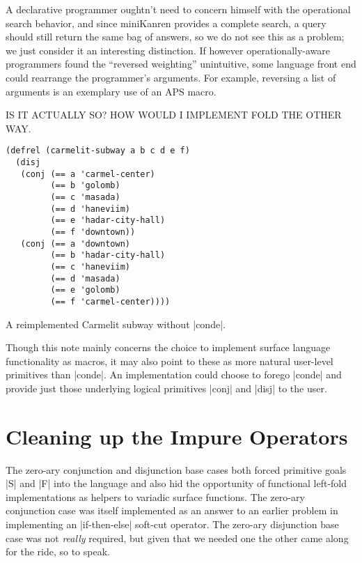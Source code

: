 \documentclass[sigplan,screen,draft,anonymous,review,natbib=false]{acmart}
\begin{document}
A declarative programmer oughtn't need to concern himself with the
operational search behavior, and since miniKanren provides a complete
search, a query should still return the same bag of answers, so we do
not see this as a problem; we just consider it an interesting
distinction. If however operationally-aware programmers found the
\enquote{reversed weighting} unintuitive, some language front end
could rearrange the programmer's arguments. For example, reversing a
list of arguments is an exemplary use of an APS macro.

IS IT ACTUALLY SO? HOW WOULD I IMPLEMENT FOLD THE OTHER WAY.

\begin{listing}
  \begin{verbatim}
(defrel (carmelit-subway a b c d e f)
  (disj
   (conj (== a 'carmel-center)
         (== b 'golomb)
         (== c 'masada)
         (== d 'haneviim)
         (== e 'hadar-city-hall)
         (== f 'downtown))
   (conj (== a 'downtown)
         (== b 'hadar-city-hall)
         (== c 'haneviim)
         (== d 'masada)
         (== e 'golomb)
         (== f 'carmel-center))))
  \end{verbatim}
  \caption{A reimplemented Carmelit subway without \rackinline|conde|.}
  \label{mnt:new-carmelit}
\end{listing}

Though this note mainly concerns the choice to implement surface
language functionality as macros, it may also point to these as more
natural user-level primitives than \rackinline|conde|. An
implementation could choose to forego \rackinline|conde| and provide
just those underlying logical primitives \rackinline|conj| and
\rackinline|disj| to the user.

\section{Cleaning up the Impure Operators}\label{sec:impure}

The zero-ary conjunction and disjunction base cases both forced
primitive goals \rackinline|S| and \rackinline|F| into the language
and also hid the opportunity of functional left-fold implementations
as helpers to variadic surface functions. The zero-ary conjunction
case was itself implemented as an answer to an earlier problem in
implementing an \rackinline|if-then-else| soft-cut operator. The
zero-ary disjunction base case was not \emph{really} required, but
given that we needed one the other came along for the ride, so to
speak.
\end{document}
